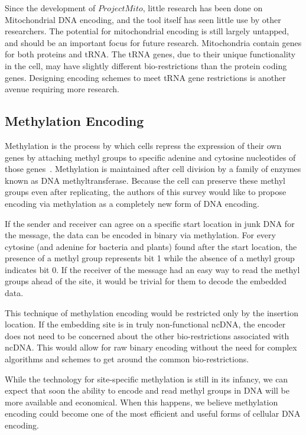 \documentclass{bioinfo}
\begin{document}
Since the development of $Project Mito$, little research has been done on Mitochondrial DNA encoding, and the tool itself has seen little use by other researchers. The potential for mitochondrial encoding is still largely untapped, and should be an important focus for future research. Mitochondria contain genes for both proteins and tRNA. The tRNA genes, due to their unique functionality in the cell, may have slightly different bio-restrictions than the protein coding genes. Designing encoding schemes to meet tRNA gene restrictions is another avenue requiring more research.

\subsection{Methylation Encoding}

Methylation is the process by which cells repress the expression of their own genes by attaching methyl groups to specific adenine and cytosine nucleotides of those genes~\cite{RRBW2006B}. Methylation is maintained after cell division by a family of enzymes known as DNA methyltransferase. Because the cell can preserve these methyl groups even after replicating, the authors of this survey would like to propose encoding via methylation as a completely new form of DNA encoding.

If the sender and receiver can agree on a specific start location in junk DNA for the message, the data can be encoded in binary via methylation. For every cytosine (and adenine for bacteria and plants) found after the start location, the presence of a methyl group represents bit 1 while the absence of a methyl group indicates bit 0. If the receiver of the message had an easy way to read the methyl groups ahead of the site, it would be trivial for them to decode the embedded data.

This technique of methylation encoding would be restricted only by the insertion location. If the embedding site is in truly non-functional ncDNA, the encoder does not need to be concerned about the other bio-restrictions associated with ncDNA. This would allow for raw binary encoding without the need for complex algorithms and schemes to get around the common bio-restrictions.

While the technology for site-specific methylation is still in its infancy, we can expect that soon the ability to encode and read methyl groups in DNA will be more available and economical. When this happens, we believe methylation encoding could become one of the most efficient and useful forms of cellular DNA encoding.
\end{document}
